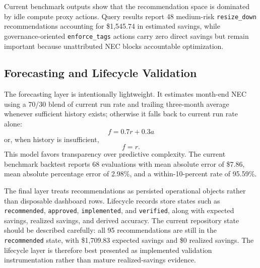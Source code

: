 Current benchmark outputs show that the recommendation space is dominated by idle compute proxy actions. Query results report 48 medium-risk \texttt{resize\_down} recommendations accounting for \$1{,}545.74 in estimated savings, while governance-oriented \texttt{enforce\_tags} actions carry zero direct savings but remain important because unattributed NEC blocks accountable optimization.

\subsection{Forecasting and Lifecycle Validation}
The forecasting layer is intentionally lightweight. It estimates month-end NEC using a 70/30 blend of current run rate and trailing three-month average whenever sufficient history exists; otherwise it falls back to current run rate alone:
\begin{equation}
f = 0.7r + 0.3a
\end{equation}
or, when history is insufficient,
\begin{equation}
f = r.
\end{equation}
This model favors transparency over predictive complexity. The current benchmark backtest reports 68 evaluations with mean absolute error of \$7.86, mean absolute percentage error of 2.98\%, and a within-10-percent rate of 95.59\%.

The final layer treats recommendations as persisted operational objects rather than disposable dashboard rows. Lifecycle records store states such as \texttt{recommended}, \texttt{approved}, \texttt{implemented}, and \texttt{verified}, along with expected savings, realized savings, and derived accuracy. The current repository state should be described carefully: all 95 recommendations are still in the \texttt{recommended} state, with \$1{,}709.83 expected savings and \$0 realized savings. The lifecycle layer is therefore best presented as implemented validation instrumentation rather than mature realized-savings evidence.
